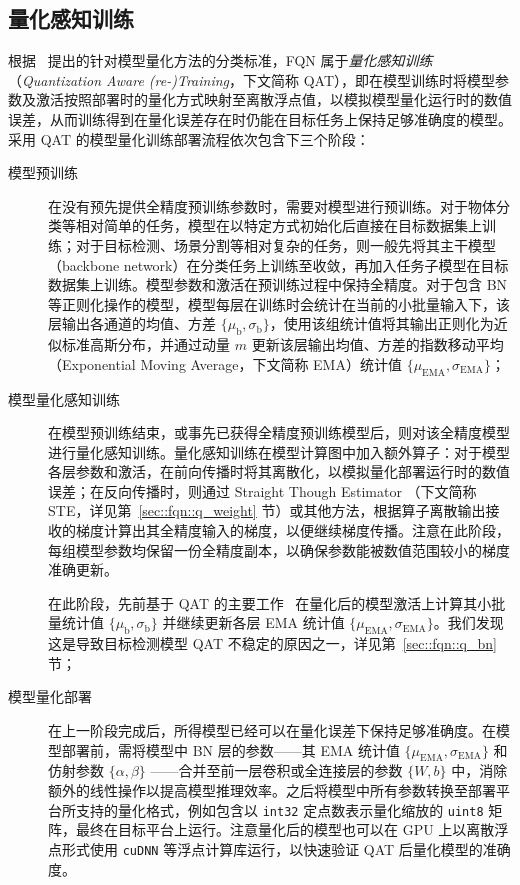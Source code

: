 \documentclass[
  fontset = mac,
]{shtthesis}
\providecommand{\EMA}[1]{{ #1 }_{\mathrm{EMA}}}
\providecommand{\Batch}[1]{{ #1 }_{\mathrm{b}}}
\begin{document}
\subsection{量化感知训练} \label{sec::fqn::qat_overview}
根据~\citet{krishnamoorthi2018quantizing} 提出的针对模型量化方法的分类标准，FQN 属于\emph{量化感知训练}（\emph{Quantization Aware (re-)Training}，下文简称 QAT），即在模型训练时将模型参数及激活按照部署时的量化方式映射至离散浮点值，以模拟模型量化运行时的数值误差，从而训练得到在量化误差存在时仍能在目标任务上保持足够准确度的模型。采用 QAT 的模型量化训练部署流程依次包含下三个阶段：
\begin{description}
  \item[模型预训练] 在没有预先提供全精度预训练参数时，需要对模型进行预训练。对于物体分类等相对简单的任务，模型在以特定方式初始化后直接在目标数据集上训练；对于目标检测、场景分割等相对复杂的任务，则一般先将其主干模型（backbone network）在分类任务上训练至收敛，再加入任务子模型在目标数据集上训练。模型参数和激活在预训练过程中保持全精度。对于包含 BN 等正则化操作的模型，模型每层在训练时会统计在当前的小批量输入下，该层输出各通道的均值、方差 $\{\Batch{\mu}, \Batch{\sigma}\}$，使用该组统计值将其输出正则化为近似标准高斯分布，并通过动量 $m$ 更新该层输出均值、方差的指数移动平均（Exponential Moving Average，下文简称 EMA）统计值 $\{\EMA{\mu}, \EMA{\sigma}\}$；
  \item[模型量化感知训练] 在模型预训练结束，或事先已获得全精度预训练模型后，则对该全精度模型进行量化感知训练。量化感知训练在模型计算图中加入额外算子：对于模型各层参数和激活，在前向传播时将其离散化，以模拟量化部署运行时的数值误差；在反向传播时，则通过 Straight Though Estimator （下文简称 STE，详见第~\ref{sec::fqn::q_weight} 节）或其他方法，根据算子离散输出接收的梯度计算出其全精度输入的梯度，以便继续梯度传播。注意在此阶段，每组模型参数均保留一份全精度副本，以确保参数能被数值范围较小的梯度准确更新。
  
  在此阶段，先前基于 QAT 的主要工作~\citet{jacob2018quantization, krishnamoorthi2018quantizing} 在量化后的模型激活上计算其小批量统计值 $\{\Batch{\mu}, \Batch{\sigma}\}$ 并继续更新各层 EMA 统计值 $\{\EMA{\mu}, \EMA{\sigma}\}$。我们发现这是导致目标检测模型 QAT 不稳定的原因之一，详见第~\ref{sec::fqn::q_bn} 节；
  \item[模型量化部署] 在上一阶段完成后，所得模型已经可以在量化误差下保持足够准确度。在模型部署前，需将模型中 BN 层的参数——其 EMA 统计值 $\{\EMA{\mu}, \EMA{\sigma}\}$ 和仿射参数 $\{\alpha, \beta\}$ ——合并至前一层卷积或全连接层的参数 $\{W, b\}$ 中，消除额外的线性操作以提高模型推理效率。之后将模型中所有参数转换至部署平台所支持的量化格式，例如包含以 \verb|int32| 定点数表示量化缩放的 \verb|uint8| 矩阵，最终在目标平台上运行。注意量化后的模型也可以在 GPU 上以离散浮点形式使用 \verb|cuDNN| 等浮点计算库运行，以快速验证 QAT 后量化模型的准确度。
\end{description}
\end{document}
